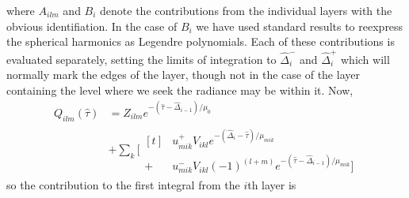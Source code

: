 where $A_{ilm}$ and $B_i$ denote the contributions from the individual
layers with the obvious identifiation. In the case of $B_i$ we have used
standard results to reexpress the spherical harmonics as Legendre 
polynomials. Each of these contributions is evaluated separately, 
setting the limits of integration to $\hat\Delta_i^-$ and $\hat\Delta_i^+$ 
which will normally mark the edges of the layer, though not in the case of 
the layer containing the level where we seek the radiance may be within it. 
Now,
\begin{equation}
\begin{split}
Q_{ilm} (\hat\tau) &= Z_{ilm} e^{-(\hat\tau -\hat\Delta_{i-1})/\mu_0} \\
&+\sum_k \biggl [ 
\begin{aligned}[t]
& u_{mik}^+ V_{ikl} e^{-(\hat\Delta_i-\hat\tau)/\mu_{mik}} \\
+& u_{mik}^- V_{ikl} (-1)^{(l+m)} e^{-(\hat\tau-\hat\Delta_{i-1})/\mu_{mik}} 
\biggr ]
\end{aligned}
\end{split}
\end{equation}
so the contribution to the first integral from the $i$th layer is

